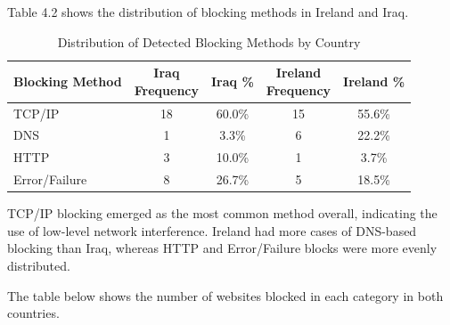 Table 4.2 shows the distribution of blocking methods in Ireland and Iraq.

\vspace{2em}

\begin{table}[H] 
\centering 
\caption{Distribution of Detected Blocking Methods by Country} 
\begin{tabular}{lcccc} 
\toprule 
\textbf{Blocking Method} & \shortstack{\textbf{Iraq} \\ \textbf{Frequency}} & \textbf{Iraq \%} & \shortstack{\textbf{Ireland} \\ \textbf{Frequency}} & \textbf{Ireland \%} \\
\midrule 
TCP/IP         & 18 & 60.0\%  & 15 & 55.6\% \\
DNS            & 1  & 3.3\%   & 6  & 22.2\% \\
HTTP           & 3  & 10.0\%  & 1  & 3.7\% \\
Error/Failure  & 8  & 26.7\%  & 5  & 18.5\% \\
\bottomrule 
\end{tabular} 
\label{tab:blocking_methods_comparison} 
\end{table}

TCP/IP blocking emerged as the most common method overall, indicating the use of low-level network interference. Ireland had more cases of DNS-based blocking than Iraq, whereas HTTP and Error/Failure blocks were more evenly distributed.

The table below shows the number of websites blocked in each category in both countries.

\vspace{2em}

